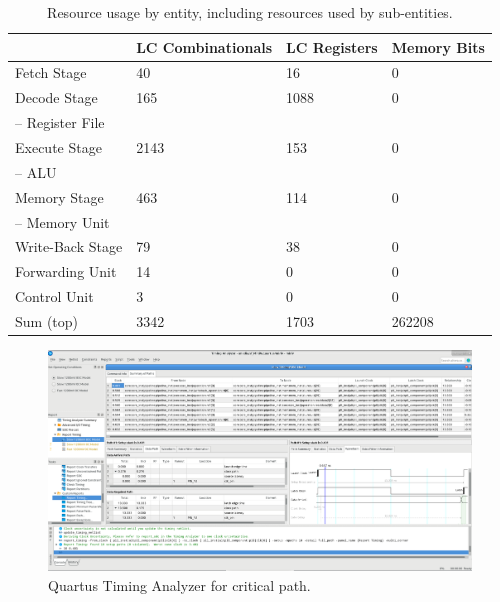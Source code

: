 \begin{table}[htb]
  \centering
  \caption{Resource usage by entity, including resources used by sub-entities.}
  \begin{tabular}{llll}
    \toprule
                         & LC Combinationals & LC Registers & Memory Bits \\
    \midrule
    Fetch Stage          &  40          & 16       & 0            \\
    Decode Stage         &  165         & 1088     & 0            \\
    -- Register File     &              &          &              \\
    Execute Stage        &  2143        & 153      & 0            \\
    -- ALU               &              &          &              \\
    Memory Stage         &  463         & 114      & 0            \\
    -- Memory Unit       &              &          &              \\
    Write-Back Stage     &  79          & 38       & 0            \\
    Forwarding Unit      &  14          & 0        & 0            \\
    Control Unit         &  3           & 0        & 0            \\
    \cmidrule{1-4}
    Sum (top)                 &  3342        & 1703     & 262208       \\
    \bottomrule
  \end{tabular}
\end{table}

\begin{qa}
  \begin{figure}[ht!]
  	\centering
  	\includegraphics[width=1.0\linewidth]{img/criticalpath.png}
  	\caption{Quartus Timing Analyzer for critical path.}
  	\label{fig:sim2}
  \end{figure}
\end{qa}

